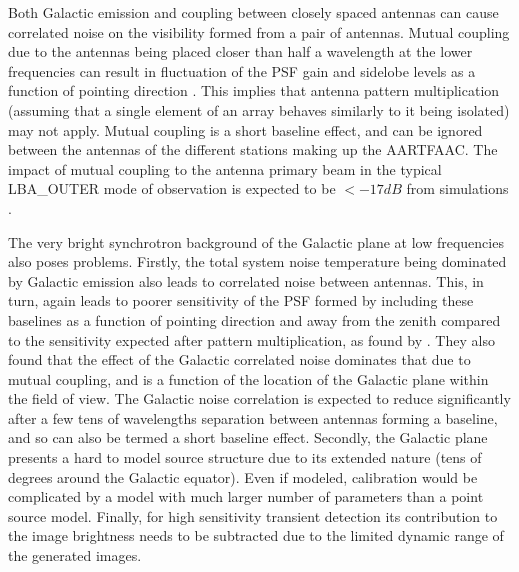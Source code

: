 \documentclass{aa}
\begin{document}
Both Galactic  emission and coupling  between closely spaced antennas  can cause
correlated  noise on  the visibility  formed from  a pair  of  antennas. Mutual
coupling due to  the antennas being placed closer than half  a wavelength at the
lower frequencies can result in fluctuation  of the PSF gain and sidelobe levels
as a function of pointing direction \citep{agrawal1972mutual}.  This implies that
antenna  pattern multiplication  (assuming that  a  single element  of an  array
behaves similarly  to it  being isolated)  may not apply.  Mutual coupling  is a
short baseline effect, and can be  ignored between the antennas of the different
stations making  up the AARTFAAC. The  impact of mutual coupling  to the antenna
primary beam  in the typical  LBA\_OUTER mode of  observation is expected  to be
$<-17dB$ from simulations \citep{wijnholds2011situ}.

The very bright synchrotron background  of the Galactic plane at low frequencies
also poses problems. Firstly, the total system noise temperature being dominated
by Galactic emission  also leads to correlated noise  between antennas. This, in
turn, again  leads to poorer  sensitivity of the  PSF formed by  including these
baselines as a function of pointing  direction and away from the zenith compared
to  the   sensitivity  expected  after  pattern  multiplication,   as  found  by
\citet{ellingson2011sensitivity}.   They  also  found  that the  effect  of  the
Galactic  correlated noise  dominates  that due  to  mutual coupling,  and is  a
function of  the location of  the Galactic plane  within the field of  view. The
Galactic noise correlation is expected  to reduce significantly after a few tens
of wavelengths separation  between antennas forming a baseline,  and so can also
be termed a short baseline effect.  Secondly, the Galactic plane presents a hard
to model source structure due to its extended nature (tens of degrees around the
Galactic equator).  Even if modeled, calibration would be complicated by a model
with much larger  number of parameters than a point  source model.  Finally, for
high sensitivity  transient detection its  contribution to the  image brightness
needs to be subtracted due to the limited dynamic range of the generated images.
\end{document}
